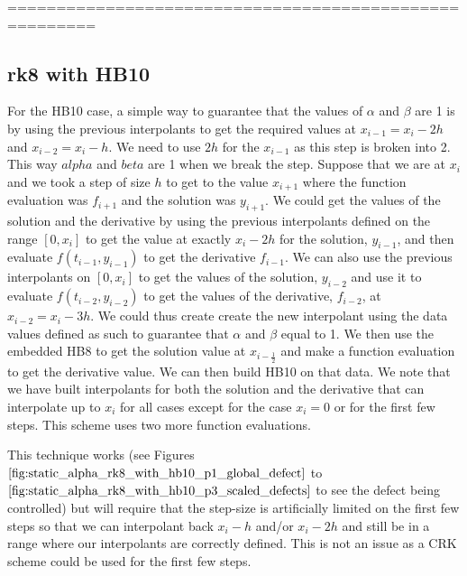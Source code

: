 =======================================================
\subsection{rk8 with HB10} For the HB10 case, a simple way to guarantee that the values of $\alpha$ and $\beta$ are 1 is by using the previous interpolants to get the required values at $x_{i - 1}=x_i-2h$ and $x_{i - 2}=x_i-h$. We need to use $2h$ for the $x_{i-1}$ as this step is broken into 2. This way $alpha$ and $beta$ are 1 when we break the step. Suppose that we are at $x_i$ and we took a step of size $h$ to get to the value $x_{i + 1}$ where the function evaluation was $f_{i + 1}$ and the solution was $y_{i + 1}$. We could get the values of the solution and the derivative by using the previous interpolants defined on the range $[0, x_i]$ to get the value at exactly $x_i - 2h$ for the solution, $y_{i - 1}$, and then evaluate $f(t_{i-1}, y_{i-1})$ to get the derivative $f_{i - 1}$.  We can also use the previous interpolants on $[0, x_i]$ to get the values of the solution, $y_{i-2}$ and use it to evaluate $f(t_{i-2}, y_{i-2})$ to get the values of the derivative, $f_{i-2}$, at $x_{i-2} = x_i - 3h$. We could thus create create the new interpolant using the data values defined as such to guarantee that $\alpha$ and $\beta$ equal to 1. We then use the embedded HB8 to get the solution value at $x_{i - \frac{1}{2}}$ and make a function evaluation to get the derivative value. We can then build HB10 on that data. We note that we have built interpolants for both the solution and the derivative that  can interpolate up to $x_i$ for all cases except for the case $x_i = 0$ or for the first few steps. This scheme uses two more function evaluations.

This technique works (see Figures $\ref{fig:static_alpha_rk8_with_hb10_p1_global_defect}$ to $\ref{fig:static_alpha_rk8_with_hb10_p3_scaled_defects}$ to see the defect being controlled) but will require that the step-size is artificially limited on the first few steps so that we can interpolant back $x_i - h$ and/or $x_i - 2h$ and still be in a range where our interpolants are correctly defined. This is not an issue as a CRK scheme could be used for the first few steps.

